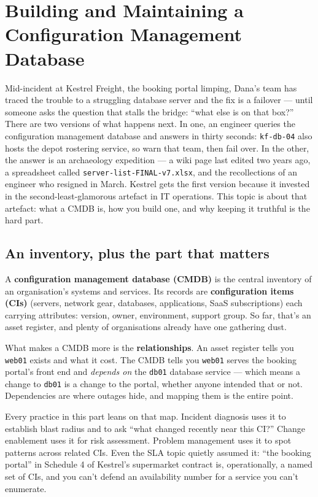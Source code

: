 \section{Building and Maintaining a Configuration Management Database}
Mid-incident at Kestrel Freight, the booking portal limping, Dana's team has traced the trouble to a struggling database server and the fix is a failover — until someone asks the question that stalls the bridge: ``what else is on that box?'' There are two versions of what happens next. In one, an engineer queries the configuration management database and answers in thirty seconds: \texttt{kf-db-04} also hosts the depot rostering service, so warn that team, then fail over. In the other, the answer is an archaeology expedition — a wiki page last edited two years ago, a spreadsheet called \texttt{server-list-FINAL-v7.xlsx}, and the recollections of an engineer who resigned in March. Kestrel gets the first version because it invested in the second-least-glamorous artefact in IT operations. This topic is about that artefact: what a CMDB is, how you build one, and why keeping it truthful is the hard part.



\subsection{An inventory, plus the part that matters}


A \textbf{configuration management database (CMDB)} is the central inventory of an organisation's systems and services. Its records are \textbf{configuration items (CIs)} (servers, network gear, databases, applications, SaaS subscriptions) each carrying attributes: version, owner, environment, support group. So far, that's an asset register, and plenty of organisations already have one gathering dust.


What makes a CMDB more is the \textbf{relationships}. An asset register tells you \texttt{web01} exists and what it cost. The CMDB tells you \texttt{web01} serves the booking portal's front end and \emph{depends on} the \texttt{db01} database service — which means a change to \texttt{db01} is a change to the portal, whether anyone intended that or not. Dependencies are where outages hide, and mapping them is the entire point.


Every practice in this part leans on that map. Incident diagnosis uses it to establish blast radius and to ask ``what changed recently near this CI?'' Change enablement uses it for risk assessment. Problem management uses it to spot patterns across related CIs. Even the SLA topic quietly assumed it: ``the booking portal'' in Schedule 4 of Kestrel's supermarket contract is, operationally, a named set of CIs, and you can't defend an availability number for a service you can't enumerate.




